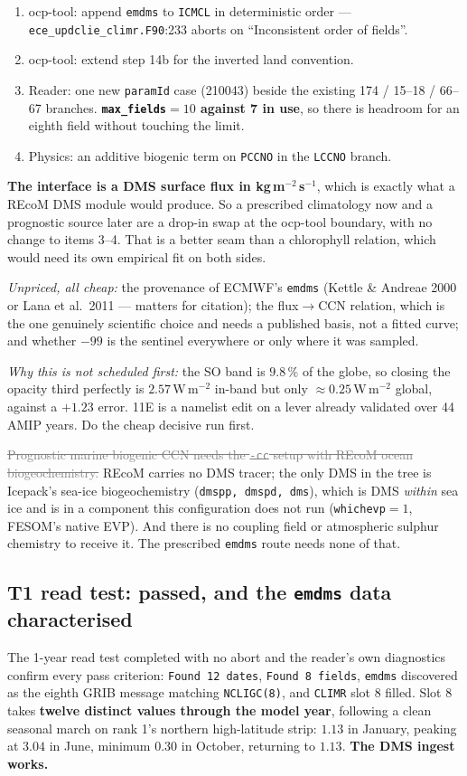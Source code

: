 \documentclass[10pt]{article}
\newcommand{\dead}[1]{\textcolor{gray}{\sout{#1}}}
\begin{document}
\begin{enumerate}\itemsep2pt
\item ocp-tool: append \texttt{emdms} to \texttt{ICMCL} in deterministic order ---
\texttt{ece\_updclie\_climr.F90}:233 aborts on ``Inconsistent order of fields''.
\item ocp-tool: extend step 14b for the inverted land convention.
\item Reader: one new \texttt{paramId} case (210043) beside the existing 174 / 15--18 /
66--67 branches. \textbf{\texttt{max\_fields}$=10$ against 7 in use}, so there is headroom
for an eighth field without touching the limit.
\item Physics: an additive biogenic term on \texttt{PCCNO} in the \texttt{LCCNO} branch.
\end{enumerate}

\textbf{The interface is a DMS surface flux in kg\,m$^{-2}$\,s$^{-1}$}, which is exactly
what a REcoM DMS module would produce. So a prescribed climatology now and a prognostic
source later are a drop-in swap at the ocp-tool boundary, with no change to items 3--4.
That is a better seam than a chlorophyll relation, which would need its own empirical fit
on both sides.

\emph{Unpriced, all cheap:} the provenance of ECMWF's \texttt{emdms} (Kettle \& Andreae
2000 or Lana et al.\ 2011 --- matters for citation); the flux$\to$CCN relation, which is the
one genuinely scientific choice and needs a published basis, not a fitted curve; and
whether $-99$ is the sentinel everywhere or only where it was sampled.

\emph{Why this is not scheduled first:} the SO band is $9.8\,\%$ of the globe, so closing
the opacity third perfectly is $2.57$\,W\,m$^{-2}$ in-band but only
${\approx}0.25$\,W\,m$^{-2}$ global, against a $+1.23$ error. 11E is a namelist edit on a
lever already validated over 44 AMIP years. Do the cheap decisive run first.

\dead{Prognostic marine biogenic CCN needs the \texttt{-cc} setup with REcoM ocean
biogeochemistry.} REcoM carries no DMS tracer; the only DMS in the tree is Icepack's
sea-ice biogeochemistry (\texttt{dmspp, dmspd, dms}), which is DMS \emph{within} sea ice and
is in a component this configuration does not run (\texttt{whichevp}$=1$, FESOM's native
EVP). And there is no coupling field or atmospheric sulphur chemistry to receive it. The
prescribed \texttt{emdms} route needs none of that.

\subsection{T1 read test: passed, and the \texttt{emdms} data characterised}\label{sub:r24t1}
The 1-year read test completed with no abort and the reader's own diagnostics confirm every
pass criterion: \texttt{Found 12 dates}, \texttt{Found 8 fields}, \texttt{emdms} discovered as
the eighth GRIB message matching \texttt{NCLIGC(8)}, and \texttt{CLIMR} slot 8 filled. Slot 8
takes \textbf{twelve distinct values through the model year}, following a clean seasonal
march on rank 1's northern high-latitude strip: $1.13$ in January, peaking at $3.04$ in June,
minimum $0.30$ in October, returning to $1.13$. \textbf{The DMS ingest works.}
\end{document}

